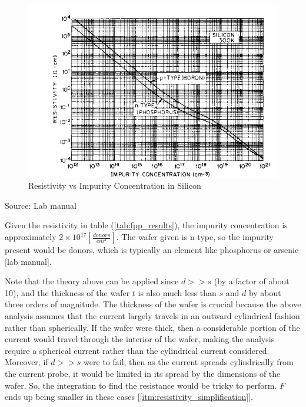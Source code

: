 \documentclass{article}
\begin{document}
\begin{figure}[h!]
	\centering
	\includegraphics[scale=0.5]{../images/resistivity_graph.PNG}
	\caption{Resistivity vs Impurity Concentration in Silicon}
	\label{fig:res_vs_imp}
\end{figure}
{\footnotesize Source: Lab manual}

\FloatBarrier

Given the resistivity in table (\ref{tab:fpp_results}), the impurity concentration is approximately $2 \times 10^{17} [\frac{donors}{cm^3}]$. The wafer given is n-type, so the impurity present would be donors, which is typically an element like phosphorus or arsenic [lab manual].

Note that the theory above can be applied since $d >> s$ (by a factor of about 10), and the thickness of the wafer $t$ is also much less than $s$ and $d$ by about three orders of magnitude. The thickness of the wafer is crucial because the above analysis assumes that the current largely travels in an outward cylindrical fashion rather than spherically. If the wafer were thick, then a considerable portion of the current would travel through the interior of the wafer, making the analysis require a spherical current rather than the cylindrical current considered. Moreover, if $d >> s$ were to fail, then as the current spreads cylindrically from the current probe, it would be limited in its spread by the dimensions of the wafer. So, the integration to find the resistance would be tricky to perform. $F$ ends up being smaller in these cases [\ref{itm:resistivity_simplification}]. %

\end{document}
